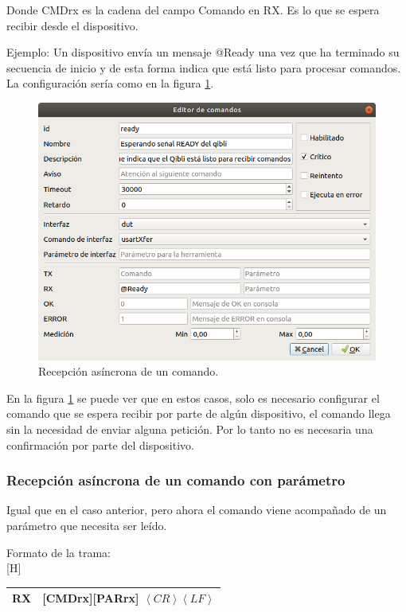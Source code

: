 \documentclass[a4paper,12pt]{refart}
\makeatletter
\renewenvironment{table}%
  {\renewcommand\familydefault\sfdefault
   \@float{table}}
  {\end@float}
\makeatother
\begin{document}
Donde CMDrx es la cadena del campo Comando en RX. Es lo que se espera recibir desde el dispositivo.

Ejemplo: Un dispositivo envía un mensaje @Ready una vez que ha terminado su secuencia de inicio y de esta forma indica que está listo para procesar comandos. La configuración sería como en la figura \ref{fig:commands5}.

\begin{figure}[H]\centering
\includegraphics[scale=0.4, frame]{images/commands5} 
\caption{Recepción asíncrona de un comando.}
\label{fig:commands5}
\end{figure}

En la figura \ref{fig:commands5} se puede ver que en estos casos, solo es necesario configurar el comando que se espera recibir por parte de algún dispositivo, el comando llega sin la necesidad de enviar alguna petición. Por lo tanto no es necesaria una confirmación por parte del dispositivo.

\subsubsection{Recepción asíncrona de un comando con parámetro}
Igual que en el caso anterior, pero ahora el comando viene acompañado de un parámetro que necesita ser leído.

Formato de la trama:
\\
\begin{table}[H]
\small\centering
\begin{tabular}{|c|l|}
\hline 
RX & [CMDrx][PARrx] $\left\langle CR \right\rangle \left\langle LF \right\rangle$ \\ 
\hline
\end{tabular}
\end{table}
\end{document}
